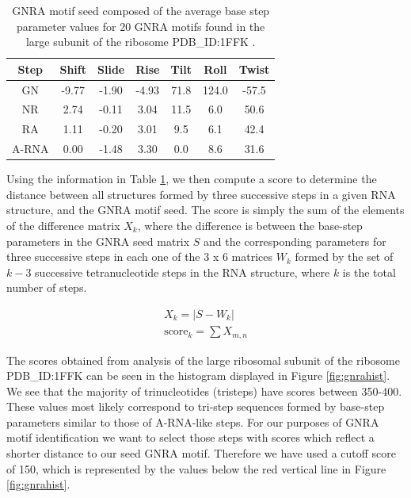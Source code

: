 \begin{table}[hb]  
\begin{center}
\begin{tabular}{|c|c|c|c|c|c|c|}
\hline
Step & Shift & Slide & Rise & Tilt & Roll & Twist \\
\hline
GN & -9.77 & -1.90 & -4.93 & 71.8 & 124.0 & -57.5 \\
NR & 2.74 & -0.11 & 3.04 & 11.5 & 6.0 & 50.6 \\
RA & 1.11 & -0.20 & 3.01 & 9.5 & 6.1 & 42.4 \\ \hline
A-RNA & 0.00 & -1.48 & 3.30 & 0.0 & 8.6 & 31.6\\
\hline
\end{tabular}
\caption{GNRA motif  seed composed of the average  base step parameter
  values for 20 GNRA motifs found in the large subunit of the ribosome
  PDB\_ID:1FFK \cite{lemieux2006}.}
\label{tab:seed}
\end{center}
\end{table}

Using the information in Table \ref{tab:seed}, we then compute a score
to  determine the  distance  between all  structures  formed by  three
successive  steps  in  a  given  RNA structure,  and  the  GNRA  motif
seed. The  score is simply the  sum of the elements  of the difference
matrix  $X_{k}$,  where  the   difference  is  between  the  base-step
parameters  in  the  GNRA   seed  matrix  $S$  and  the  corresponding
parameters  for three  successive  steps in  each  one of  the  3 x  6
matrices $W_{k}$ formed by the set of $k-3$ successive tetranucleotide
steps in the RNA structure, where  $k$ is the total number of steps.

\begin{gather}
X_{k} = |S - W_{k}| \\
\text{score}_{k} = \sum X_{m,n} 
\label{eq:sumdiffscore}
\end{gather}  

The scores  obtained from analysis  of the large ribosomal  subunit of
the ribosome  PDB\_ID:1FFK can be  seen in the histogram  displayed in
Figure \ref{fig:gnrahist}. We see  that the majority of trinucleotides
(tristeps)  have scores  between  350-400.  These  values most  likely
correspond  to  tri-step  sequences  formed  by  base-step  parameters
similar to those of A-RNA-like  steps.  For our purposes of GNRA motif
identification we want to select those steps with scores which reflect
a shorter distance  to our seed GNRA motif.  Therefore  we have used a
cutoff score of 150, which is  represented by the values below the red
vertical line in Figure \ref{fig:gnrahist}.

